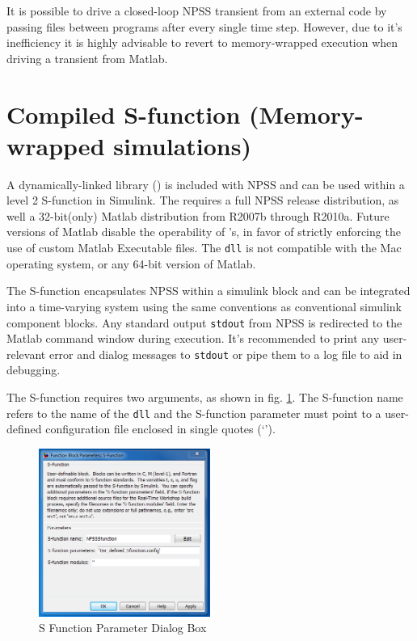 \documentclass[heading.tex]{subfiles}
\begin{document}
It is possible to drive a closed-loop NPSS transient from an external code
by passing files between programs after every single time step.
However, due to it's inefficiency it is highly advisable to revert to
memory-wrapped execution when driving a transient from Matlab.

\section{Compiled S-function (Memory-wrapped simulations)}

A dynamically-linked library () is included with NPSS
and can be used within a level 2 S-function in Simulink.
The  requires a full NPSS release distribution,
as well a 32-bit(only) Matlab distribution from R2007b through R2010a.
Future versions of Matlab disable the operability of 's,
in favor of strictly enforcing the use of custom Matlab Executable  files.
The \texttt{dll} is not compatible with the Mac operating system, or any 64-bit version
of Matlab.

The S-function encapsulates NPSS within a simulink block and can be integrated into a time-varying
system using the same conventions as conventional simulink component blocks.
Any standard output \texttt{stdout} from NPSS is redirected to the Matlab command window during execution. 
It's recommended to print any user-relevant error and dialog messages to \texttt{stdout}
or pipe them to a log file to aid in debugging.

The S-function requires two arguments, as shown in fig. \ref{f:DialogBox}.
The S-function name refers to the name of the \texttt{dll} and the S-function parameter must point
to a user-defined configuration file enclosed in single quotes (`').

\begin{figure}[H]
\centering
\includegraphics[width=0.5\textwidth]{images/SFuncDialog}
\caption{S Function Parameter Dialog Box}
\label{f:DialogBox}
\end{figure}
\end{document}
